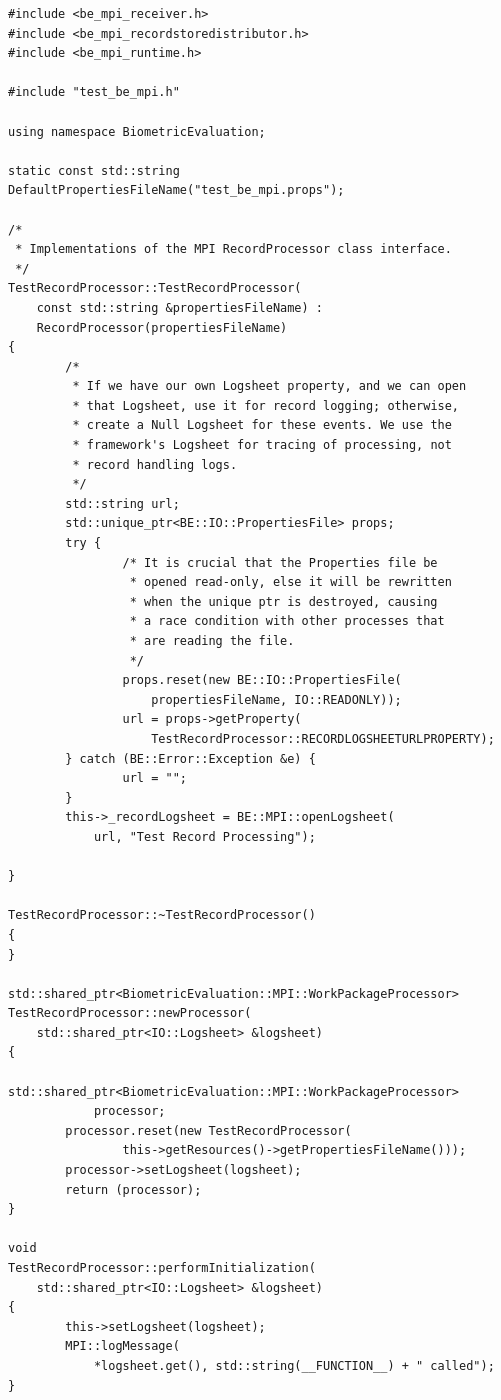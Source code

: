 \begin{lstlisting}[caption={MPI Framework Application Implementation}, label=lst:mpiappimpl]
#include <be_mpi_receiver.h>
#include <be_mpi_recordstoredistributor.h>
#include <be_mpi_runtime.h>

#include "test_be_mpi.h"

using namespace BiometricEvaluation;

static const std::string DefaultPropertiesFileName("test_be_mpi.props");

/*
 * Implementations of the MPI RecordProcessor class interface.
 */
TestRecordProcessor::TestRecordProcessor(
    const std::string &propertiesFileName) :
    RecordProcessor(propertiesFileName)
{
        /*
         * If we have our own Logsheet property, and we can open
         * that Logsheet, use it for record logging; otherwise,
         * create a Null Logsheet for these events. We use the 
         * framework's Logsheet for tracing of processing, not
         * record handling logs.
         */
        std::string url;
        std::unique_ptr<BE::IO::PropertiesFile> props;
        try {
                /* It is crucial that the Properties file be
                 * opened read-only, else it will be rewritten
                 * when the unique ptr is destroyed, causing
                 * a race condition with other processes that
                 * are reading the file.
                 */
                props.reset(new BE::IO::PropertiesFile(
                    propertiesFileName, IO::READONLY));
                url = props->getProperty(
                    TestRecordProcessor::RECORDLOGSHEETURLPROPERTY);
        } catch (BE::Error::Exception &e) {
                url = "";
        }
        this->_recordLogsheet = BE::MPI::openLogsheet(
            url, "Test Record Processing");

}

TestRecordProcessor::~TestRecordProcessor()
{
}

std::shared_ptr<BiometricEvaluation::MPI::WorkPackageProcessor>
TestRecordProcessor::newProcessor(
    std::shared_ptr<IO::Logsheet> &logsheet)
{
        std::shared_ptr<BiometricEvaluation::MPI::WorkPackageProcessor>
            processor;
        processor.reset(new TestRecordProcessor(
                this->getResources()->getPropertiesFileName()));
        processor->setLogsheet(logsheet);
        return (processor);
}

void
TestRecordProcessor::performInitialization(
    std::shared_ptr<IO::Logsheet> &logsheet)
{
        this->setLogsheet(logsheet);
        MPI::logMessage(
            *logsheet.get(), std::string(__FUNCTION__) + " called");
}


\end{lstlisting}
